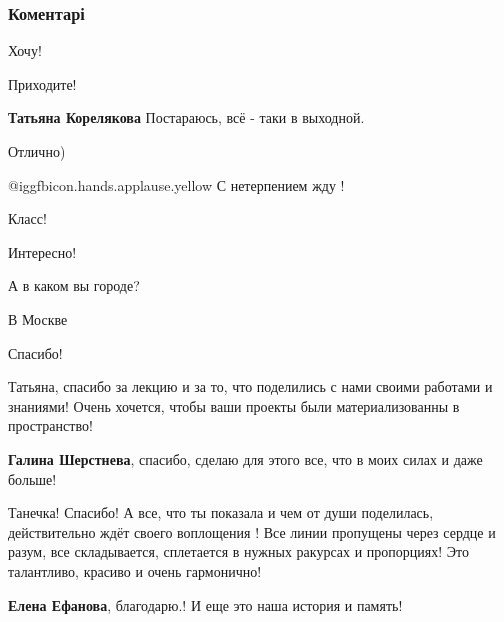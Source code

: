  
 
 
 
 
\subsubsection{Коментарі}

\begin{itemize} %
Хочу!

Приходите!

\textbf{Татьяна Корелякова} Постараюсь, всё - таки в выходной.

Отлично)

 @igg{fbicon.hands.applause.yellow}  С нетерпением жду !

Класс!

Интересно!

А в каком вы городе?

В Москве

Спасибо!


Татьяна, спасибо за лекцию и за то, что поделились с нами своими работами и
знаниями! Очень хочется, чтобы ваши проекты были материализованны в пространство!

\begin{itemize} %
\textbf{Галина Шерстнева}, спасибо, сделаю для этого все, что в моих силах и даже больше!

Танечка! Спасибо! А все, что ты показала и чем от души поделилась, действительно ждёт своего воплощения ! Все линии пропущены через сердце и разум, все складывается, сплетается в нужных ракурсах и пропорциях! Это талантливо, красиво и очень гармонично!

\textbf{Елена Ефанова}, благодарю.! И еще это наша история и память!



\end{itemize}
\end{itemize}
